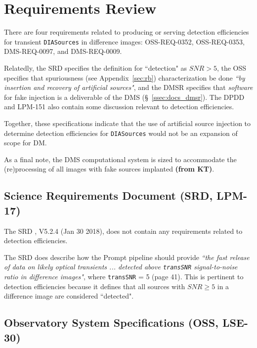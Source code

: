 \section{Requirements Review}\label{sec:docs}

There are four requirements related to producing or serving detection efficiencies for transient {\tt DIASources} in difference images: OSS-REQ-0352, OSS-REQ-0353, DMS-REQ-0097, and DMS-REQ-0009.

Relatedly, the SRD specifies the definition for ``detection" as $SNR>5$, the OSS specifies that spuriousness (see Appendix~\ref{sec:rb}) characterization be done {\it ``by insertion and recovery of artificial sources"}, and the DMSR specifies that {\it software} for fake injection is a deliverable of the DMS (\S~\ref{ssec:docs_dmsr}).
The DPDD and LPM-151 also contain some discussion relevant to detection efficiencies.

Together, these specifications indicate that the use of artificial source injection to determine detection efficiencies for {\tt DIASources} would not be an expansion of scope for DM.

As a final note, the DMS computational system is sized to accommodate the (re)processing of all images with fake sources implanted {\bf (from KT)}.


\subsection{Science Requirements Document (SRD, LPM-17)}

The SRD , V5.2.4 (Jan 30 2018), does not contain any requirements related to detection efficiencies.

The SRD does describe how the Prompt pipeline should provide {\it ``the fast release of data on likely optical transients ... detected above {\tt transSNR} signal-to-noise ratio in difference images"}, where {\tt transSNR} = 5 (page 41).
This is pertinent to detection efficiencies because it defines that all sources with $SNR \geq 5$ in a difference image are considered ``detected".


\subsection{Observatory System Specifications (OSS, LSE-30)}\label{ssec:docs_oss}

